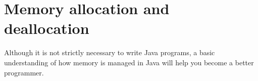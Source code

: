 \section{Memory allocation and deallocation}
\label{sec:memory-alloc-deall}

Although it is not strictly necessary to write Java programs, a basic
understanding of how memory is managed in Java will help you become a
better programmer. 

